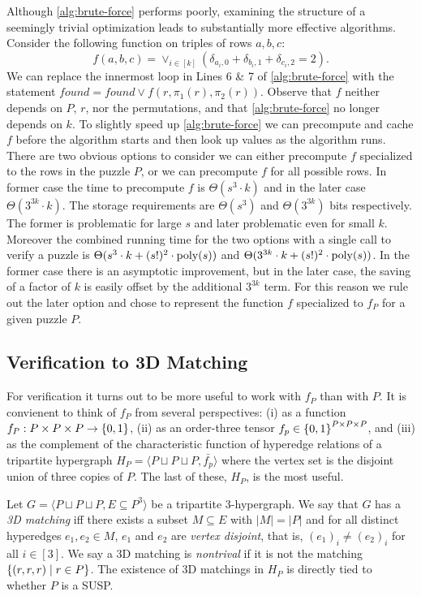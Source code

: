 \documentclass[11pt]{article}
\newcommand\sse{\subseteq}
\newcommand\condset[2]{\set{#1 \;|\; #2}}
\begin{document}
Although \autoref{alg:brute-force} performs poorly, examining the
structure of a seemingly trivial optimization leads to substantially
more effective algorithms. Consider the following function on triples
of rows $a, b, c$: $$f(a,b,c) = \vee_{i \in [k]} (\delta_{a_i,0} +
\delta_{b_i,1} + \delta_{c_i,2} = 2).$$ We can replace the innermost
loop in Lines 6 \& 7 of \autoref{alg:brute-force} with the statement
$found = found \vee f(r, \pi_1(r), \pi_2(r))$.  Observe that $f$
neither depends on $P$, $r$, nor the permutations, and that
\autoref{alg:brute-force} no longer depends on $k$.  To slightly speed
up \autoref{alg:brute-force} we can precompute and cache $f$ before
the algorithm starts and then look up values as the algorithm runs.
There are two obvious options to consider we can either precompute $f$
specialized to the rows in the puzzle $P$, or we can precompute $f$
for all possible rows.  In former case the time to precompute $f$ is
$\Theta(s^3 \cdot k)$ and in the later case $\Theta(3^{3k} \cdot k)$.
The storage requirements are $\Theta(s^3)$ and $\Theta(3^{3k})$ bits
respectively.  The former is problematic for large $s$ and later
problematic even for small $k$.  Moreover the combined running time
for the two options with a single call to verify a puzzle is
$\Theta(s^3 \cdot k + (s!)^2 \cdot \operatorname{poly}(s))$ and $\Theta(3^{3k} \cdot
k + (s!)^2 \cdot \operatorname{poly}(s))$.  In the former case there is an
asymptotic improvement, but in the later case, the saving of a factor
of $k$ is easily offset by the additional $3^{3k}$ term.  For this
reason we rule out the later option and chose to represent the
function $f$ specialized to $f_P$ for a given puzzle $P$.


\subsection{Verification to 3D Matching}
\label{sec:3DM}

For verification it turns out to be more useful to work with $f_P$
than with $P$.  It is convienent to think of $f_P$ from several
perspectives: (i) as a function $f_P : P \times P \times P \rightarrow
\left\{ 0, 1 \right\}$, (ii) as an order-three tensor $f_p \in \left\{ 0,1 \right\}^{P
  \times P \times P}$, and (iii) as the complement of the
characteristic function of hyperedge relations of a tripartite
hypergraph $H_P = \langle P \sqcup P \sqcup P, \bar{f_p}\rangle$ where
the vertex set is the disjoint union of three copies of $P$.  The last
of these, $H_P$, is the most useful.

Let $G = \langle P \sqcup P \sqcup P, E \sse P^3\rangle$ be a
tripartite 3-hypergraph.  We say that $G$ has a \emph{3D matching} iff
there exists a subset $M \sse E$ with $|M| = |P|$ and for all distinct
hyperedges $e_1, e_2 \in M$, $e_1$ and $e_2$ are \emph{vertex
  disjoint}, that is, $(e_1)_i \neq (e_2)_i$ for all $i \in [3]$.  We
say a 3D matching is \emph{nontrival} if it is not the matching
$\condset{(r,r,r)}{r \in P}$.  The existence of 3D matchings in $H_P$
is directly tied to whether $P$ is a SUSP.
\end{document}
